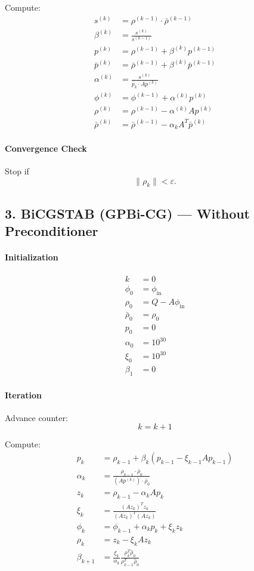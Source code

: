 \documentclass[11pt]{article}
\begin{document}
Compute:
\begin{align*}
s^{(k)} &= \rho^{(k-1)} \cdot \bar{\rho}^{(k-1)} \\
\beta^{(k)} &= \frac{s^{(k)}}{s^{(k-1)}} \\
p^{(k)} &= \rho^{(k-1)} + \beta^{(k)} p^{(k-1)} \\
\bar{p}^{(k)} &= \bar{\rho}^{(k-1)} + \beta^{(k)} \bar{p}^{(k-1)} \\
\alpha^{(k)} &= \frac{s^{(k)}}{\bar{p}_k \cdot A p^{(k)}} \\
\phi^{(k)} &= \phi^{(k-1)} + \alpha^{(k)} p^{(k)} \\
\rho^{(k)} &= \rho^{(k-1)} - \alpha^{(k)} A p^{(k)} \\
\bar{\rho}^{(k)} &= \bar{\rho}^{(k-1)} - \alpha_k A^{T}\bar{p}^{(k)}
\end{align*}

\paragraph{Convergence Check}
Stop if
\[\|\rho_k\| < \varepsilon.\]

\subsection{3. BiCGSTAB (GPBi-CG) --- Without Preconditioner}

\paragraph{Initialization}
\begin{align*}
k &= 0 \\
\phi_0 &= \phi_{\text{in}} \\
\rho_0 &= Q - A\phi_{\text{in}} \\
\bar{\rho}_0 &= \rho_0 \\
p_0 &= 0 \\
\alpha_0 &= 10^{30} \\
\xi_0 &= 10^{30} \\
\beta_1 &= 0
\end{align*}

\paragraph{Iteration}
Advance counter:
\[
k = k+1
\]

Compute:
\begin{align*}
p_k &= \rho_{k-1}
+\beta_k
\left(
p_{k-1}
-\xi_{k-1}A p_{k-1}
\right)
\\
\alpha_k &= \frac{\rho_{k-1} \cdot \bar{\rho}_0}{(A p^{(k)}) \cdot \bar{\rho}_0}
\\
z_k &= \rho_{k-1} - \alpha_k A p_k
\\
\xi_k &=
\frac{(A z_k)^{T}z_k}
     {(A z_k)^{T}(A z_k)}
\\
\phi_k &=
\phi_{k-1}
+\alpha_k p_k
+\xi_k z_k
\\
\rho_k &=
z_k-\xi_k A z_k
\\
\beta_{k+1}
&=
\frac{\xi_k}{\alpha_k}
\frac{\rho_k^{T}\hat{\rho}_0}
     {\rho_{k-1}^{T}\hat{\rho}_0}
\end{align*}
\end{document}
